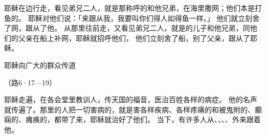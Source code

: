 {\par }{\PP {}耶稣在{}边行走，看见弟兄二人，就是那称呼{}的{}和他兄弟{}，在海里撒网；他们本是打鱼的。
耶稣对他们说：「来跟从我，我要叫你们得人如得鱼一样。」
他们就立刻舍了网，跟从了他。
从那里往前走，又看见弟兄二人，就是{}的儿子{}和他兄弟{}，同他们的父亲{}在船上补网，耶稣就招呼他们，
他们立刻舍了船，别了父亲，跟从了耶稣。
\par }{\SH 耶稣向广大的群众传道
\par }{\R （路6·17—19）
\par }{\PP {}耶稣走遍{}，在各会堂里教训人，传天国的福音，医治百姓各样的病症。
他的名声就传遍了{}。那里的人把一切害病的，就是害各样疾病、各样疼痛的和被鬼附的、癫痫的、瘫痪的，都带了来，耶稣就治好了他们。
当下，有许多人从{}、{}、{}、{}、{}外来跟着他。

}
